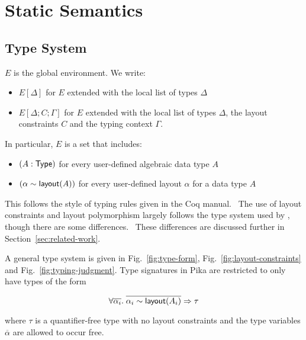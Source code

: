 \section{Static Semantics}

\subsection{Type System}

$E$ is the global environment. We write:

\begin{itemize}
  \item $E[\Delta]$ for $E$ extended with the local list of types $\Delta$
  \item $E[\Delta;C;\Gamma]$ for $E$ extended with the local list of types $\Delta$, the
    layout constraints $C$ and the typing context $\Gamma$.
\end{itemize}

\noindent
In particular, $E$ is a set that includes:
\begin{itemize}
  \item $(A : \textsf{Type})$ for every user-defined algebraic data type $A$
  \item $(\alpha \sim \textsf{layout}(A))$ for every user-defined layout $\alpha$ for a data type $A$
\end{itemize}

\noindent
This follows the style of typing rules given in the Coq manual.~\cite{Coq-typing-rules} The use of layout constraints and layout
polymorphism largely follows the type system used by \Dargent, though there are some differences.~\cite{Dargent} These differences
are discussed further in Section~\ref{sec:related-work}.

A general type system is given in Fig.~\ref{fig:type-form}, Fig.~\ref{fig:layout-constraints} and Fig.~\ref{fig:typing-judgment}. Type signatures
in Pika are restricted to only have types of the form

\[
  \forall \overline{\alpha_i}.\; \overline{\alpha_i \sim \textsf{layout}(A_i)} \Rightarrow \tau
\]

\noindent
where $\tau$ is a quantifier-free type with no layout constraints and the type variables $\overline{\alpha}$ are allowed to occur free.

